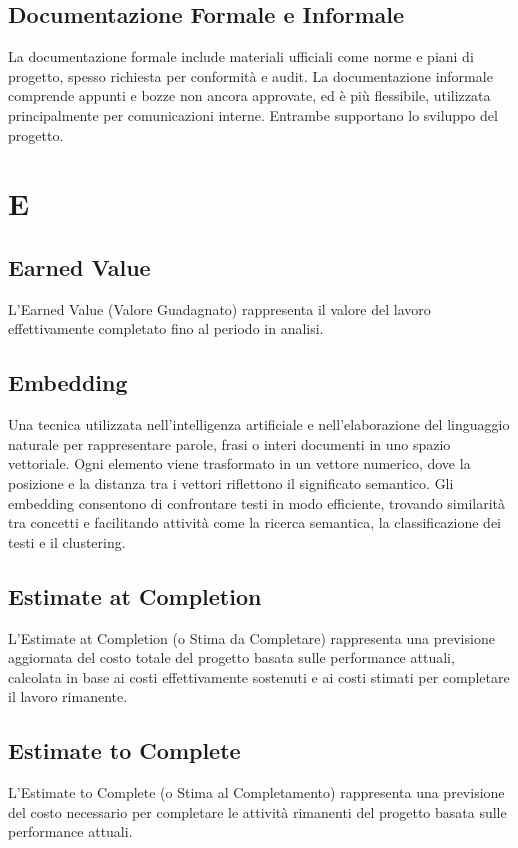 \documentclass{article}
\begin{document}
\subsection{Documentazione Formale e Informale}
La documentazione formale include materiali ufficiali come norme e piani di progetto, spesso richiesta per conformità e audit. La documentazione informale comprende appunti e bozze non ancora approvate, ed è più flessibile, utilizzata principalmente per comunicazioni interne. Entrambe supportano lo sviluppo del progetto.


\newpage
\section{E}

\subsection{Earned Value}
L’Earned Value (Valore Guadagnato) rappresenta il valore del lavoro effettivamente completato fino al periodo in analisi.

\subsection{Embedding}
Una tecnica utilizzata nell'intelligenza artificiale e nell'elaborazione del linguaggio naturale per rappresentare parole, frasi o interi documenti in uno spazio vettoriale. Ogni elemento viene trasformato in un vettore numerico, dove la posizione e la distanza tra i vettori riflettono il significato semantico. Gli embedding consentono di confrontare testi in modo efficiente, trovando similarità tra concetti e facilitando attività come la ricerca semantica, la classificazione dei testi e il clustering.

\subsection{Estimate at Completion}
L’Estimate at Completion (o Stima da Completare) rappresenta una previsione aggiornata del costo totale del progetto basata sulle performance attuali, calcolata in base ai costi effettivamente sostenuti e ai costi stimati per completare il lavoro rimanente.

\subsection{Estimate to Complete}
L’Estimate to Complete (o Stima al Completamento) rappresenta una previsione del costo necessario per completare le attività rimanenti del progetto basata sulle performance attuali.
\end{document}
